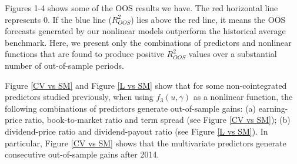 \documentclass[a4paper,12pt,times,numbered,print,index]{report}
\numberwithin{equation}{section}
\begin{document}
	
	Figures 1-4 shows some of the OOS results we have. The red horizontal line represents 0. If the blue line ($ R^2_{OOS}$) lies above the red line, it means the OOS forecasts generated by our nonlinear models outperform the historical average benchmark. Here, we present only the combinations of predictors and nonlinear functions that are found to produce positive $ R^2_{OOS}$ values over a substantial number of out-of-sample periods. 
	
	Figure \ref{CV vs SM} and Figure \ref{L vs SM} show that for some non-cointegrated predictors studied previously,  when using $f_3\left( u,\gamma\right)$ as a nonlinear function, the following combinations of predictors generate out-of-sample gains: (a) earning-price ratio, book-to-market ratio and term spread (see Figure \ref{CV vs SM}); (b) dividend-price ratio and dividend-payout ratio (see Figure \ref{L vs SM}). In particular, Figure \ref{CV vs SM} shows that the multivariate predictors generate consecutive out-of-sample gains after 2014. 
	
	
	
	
	
	
\end{document}

